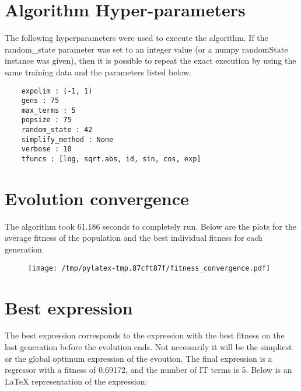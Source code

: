 \documentclass{article}%
\begin{document}
%
\vfill \pagebreak

%
\section*{Algorithm Hyper-parameters}%
\label{sec:AlgorithmHyper{-}parameters}%

                The following hyperparameters were used to execute the
                algorithm. If the random\_state parameter was set to an 
                integer value (or a numpy randomState instance was given), then
                it is possible to repeat the exact execution by using the same
                training data and the parameters listed below.%
{\footnotesize \begin{verbatim}    expolim : (-1, 1)
    gens : 75
    max_terms : 5
    popsize : 75
    random_state : 42
    simplify_method : None
    verbose : 10
    tfuncs : [log, sqrt.abs, id, sin, cos, exp]\end{verbatim} } \vfill \pagebreak

%

            \chead{}
            \rhead{\today, \currenttime}
            
            \lfoot{}
            \cfoot{}
            \rfoot{\thepage\ | \pageref{LastPage}}
\section*{Evolution convergence}%
\label{sec:Evolutionconvergence}%

                The algorithm took 61.186 seconds to
                completely run. Below are the plots for the average fitness
                of the population and the best individual fitness for each
                generation.\vfill%


\begin{figure}[H]%
\centering%
\texttt{[image: /tmp/pylatex-tmp.87cft87f/fitness\_convergence.pdf]}%
\end{figure}

%
\vfill \pagebreak

%
\section*{Best expression}%
\label{sec:Bestexpression}%

                The best expression corresponds to the expression with
                the best fitness on the last generation before the evolution
                ends. Not necessarily it will be the simpliest or the global
                optimum expression of the evoution. The final expression is a regressor with a fitness of
                0.69172, and the number of IT terms is
                5. Below is an LaTeX representation
                of the expression:
                
\end{document}
